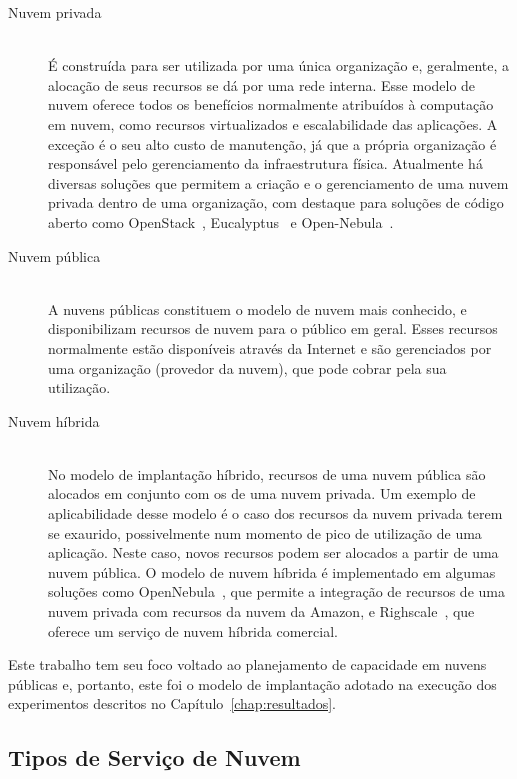 \begin{description}
\item[Nuvem privada] \hfill \\ É construída para ser utilizada por uma única 
organização e, geralmente, a alocação de seus recursos se dá por uma rede interna. 
Esse modelo de nuvem oferece todos os benefícios normalmente atribuídos à computação 
em nuvem, como recursos virtualizados e escalabilidade das aplicações. A exceção 
é o seu alto custo de manutenção, já que a própria organização é responsável pelo 
gerenciamento da infraestrutura física. Atualmente há diversas soluções que permitem 
a criação e o gerenciamento de uma nuvem privada dentro de uma organização, com 
destaque para soluções de código aberto como OpenStack~\cite{openstack}, 
Eucalyptus~\cite{eucalyptus} e Open-Nebula~\cite{opennebula}.

\item[Nuvem pública] \hfill \\ A nuvens públicas constituem o modelo de nuvem 
mais conhecido, e disponibilizam recursos de nuvem para o público em geral. Esses 
recursos normalmente estão disponíveis através da Internet e são gerenciados por 
uma organização (provedor da nuvem), que pode cobrar pela sua utilização. 

\item[Nuvem híbrida] \hfill \\ No modelo de implantação híbrido, recursos de uma 
nuvem pública são alocados em conjunto com os de uma nuvem privada. Um exemplo de 
aplicabilidade desse modelo é o caso dos recursos da nuvem privada terem se exaurido,
possivelmente num momento de pico de utilização de uma aplicação. Neste caso, 
novos recursos podem ser alocados a partir de uma nuvem pública. O modelo de 
nuvem híbrida é implementado em algumas soluções como OpenNebula~\cite{opennebula}, 
que permite a integração de recursos de uma nuvem privada com recursos da nuvem 
da Amazon, e Righscale~\cite{rightscale}, que oferece um serviço de nuvem híbrida 
comercial.
\end{description}

Este trabalho tem seu foco voltado ao planejamento de capacidade em
nuvens públicas e, portanto, este foi o modelo de implantação adotado na execução
dos experimentos descritos no Capítulo~\ref{chap:resultados}. 

\subsection{Tipos de Serviço de Nuvem}

